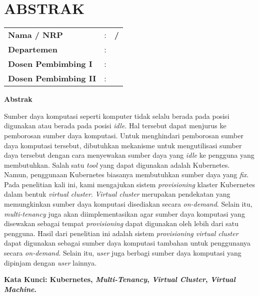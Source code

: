 \chapter*{ABSTRAK}


\vspace{2ex}

\begin{center}
  \large\textbf{\tatitle{}}
\end{center}

\vspace{2ex}

\begingroup
\setlength{\tabcolsep}{0pt}

\noindent
\begin{tabularx}{\textwidth}{l >{\centering}m{2em} X}
  \textbf{Nama / NRP}           & : & \textbf{\name{} / \nrp{}} \\
  \textbf{Departemen}           & : & \textbf{\department{}}    \\
  \textbf{Dosen Pembimbing I}   & : & \textbf{\advisor{}}       \\
  \textbf{Dosen Pembimbing II}  & : & \textbf{\coadvisor{}}     \\
\end{tabularx}
\endgroup

\noindent
\textbf{Abstrak}

Sumber daya komputasi seperti komputer tidak selalu berada
pada posisi digunakan atau berada pada posisi \emph{idle}.
Hal tersebut dapat menjurus ke pemborosan sumber daya komputasi.
Untuk menghindari pemborosan sumber daya komputasi tersebut,
dibutuhkan mekanisme untuk mengutilisasi sumber daya tersebut dengan cara
menyewakan sumber daya yang \emph{idle} ke pengguna yang membutuhkan. Salah satu \emph{tool} yang
dapat digunakan adalah Kubernetes. Namun, penggunaan Kubernetes
biasanya membutuhkan sumber daya yang \emph{fix}. Pada
penelitian kali ini, kami mengajukan sistem \emph{provisioning}
klaster Kubernetes dalam bentuk \emph{virtual cluster}. \emph{Virtual cluster}
merupakan pendekatan yang memungkinkan sumber daya komputasi disediakan secara
\emph{on-demand}. Selain itu, \emph{multi-tenancy} juga akan diimplementasikan
agar sumber daya komputasi yang disewakan sebagai tempat \emph{provisioning} dapat digunakan
oleh lebih dari satu pengguna. Hasil dari penelitian ini
adalah sistem \emph{provisioning virtual cluster} dapat digunakan sebagai
sumber daya komputasi tambahan untuk penggunanya secara \emph{on-demand}. Selain itu,
\emph{user} juga berbagi sumber daya komputasi yang dipinjam dengan
\emph{user} lainnya.

\vspace{2ex}
\noindent
\textbf{Kata Kunci: Kubernetes, \emph{Multi-Tenancy}, \emph{Virtual Cluster}, \emph{Virtual Machine}.}
